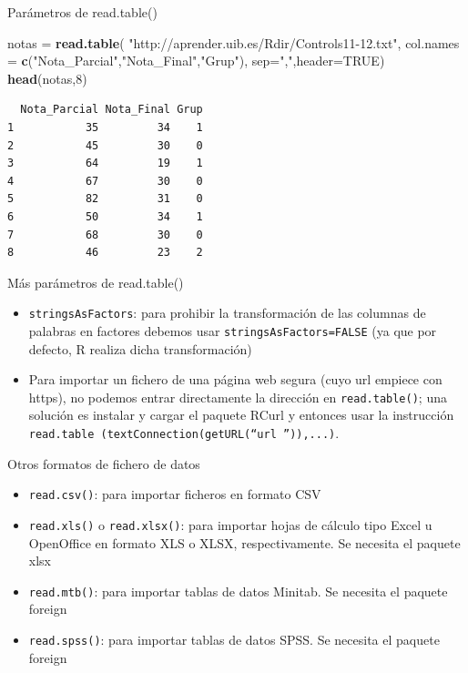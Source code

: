 \documentclass[
  ignorenonframetext,
  aspectratio=169]{beamer}
\newenvironment{Shaded}{\begin{snugshade}}{\end{snugshade}}
\newcommand{\AttributeTok}[1]{\textcolor[rgb]{0.13,0.29,0.53}{#1}}
\newcommand{\ConstantTok}[1]{\textcolor[rgb]{0.56,0.35,0.01}{#1}}
\newcommand{\DecValTok}[1]{\textcolor[rgb]{0.00,0.00,0.81}{#1}}
\newcommand{\FunctionTok}[1]{\textcolor[rgb]{0.13,0.29,0.53}{\textbf{#1}}}
\newcommand{\NormalTok}[1]{#1}
\newcommand{\OtherTok}[1]{\textcolor[rgb]{0.56,0.35,0.01}{#1}}
\newcommand{\StringTok}[1]{\textcolor[rgb]{0.31,0.60,0.02}{#1}}
\providecommand{\tightlist}{%
  \setlength{\itemsep}{0pt}\setlength{\parskip}{0pt}}
\begin{document}
\begin{frame}[fragile]{Parámetros de read.table()}
\label{paruxe1metros-de-read.table}
\begin{Shaded}
\begin{Highlighting}[]
\NormalTok{notas }\OtherTok{=} \FunctionTok{read.table}\NormalTok{(}
  \StringTok{"http://aprender.uib.es/Rdir/Controls11{-}12.txt"}\NormalTok{, }
  \AttributeTok{col.names =} \FunctionTok{c}\NormalTok{(}\StringTok{"Nota\_Parcial"}\NormalTok{,}\StringTok{"Nota\_Final"}\NormalTok{,}\StringTok{"Grup"}\NormalTok{),}
  \AttributeTok{sep=}\StringTok{","}\NormalTok{,}\AttributeTok{header=}\ConstantTok{TRUE}\NormalTok{)}
\FunctionTok{head}\NormalTok{(notas,}\DecValTok{8}\NormalTok{)}
\end{Highlighting}
\end{Shaded}

\begin{verbatim}
  Nota_Parcial Nota_Final Grup
1           35         34    1
2           45         30    0
3           64         19    1
4           67         30    0
5           82         31    0
6           50         34    1
7           68         30    0
8           46         23    2
\end{verbatim}
\end{frame}

\begin{frame}[fragile]{Más parámetros de read.table()}
\label{muxe1s-paruxe1metros-de-read.table}
\begin{itemize}
\item
  \texttt{stringsAsFactors}: para prohibir la transformación de las
  columnas de palabras en factores debemos usar
  \texttt{stringsAsFactors=FALSE} (ya que por defecto, R realiza dicha
  transformación)
\item
  Para importar un fichero de una página web segura (cuyo url empiece
  con https), no podemos entrar directamente la dirección en
  \texttt{read.table()}; una solución es instalar y cargar el paquete
  RCurl y entonces usar la instrucción
  \texttt{read.table\ (textConnection(getURL(“url\ ”)),...)}.
\end{itemize}
\end{frame}

\begin{frame}[fragile]{Otros formatos de fichero de datos}
\label{otros-formatos-de-fichero-de-datos}
\begin{itemize}
\tightlist
\item
  \texttt{read.csv()}: para importar ficheros en formato CSV
\item
  \texttt{read.xls()} o \texttt{read.xlsx()}: para importar hojas de
  cálculo tipo Excel u OpenOffice en formato XLS o XLSX,
  respectivamente. Se necesita el paquete xlsx
\item
  \texttt{read.mtb()}: para importar tablas de datos Minitab. Se
  necesita el paquete foreign
\item
  \texttt{read.spss()}: para importar tablas de datos SPSS. Se necesita
  el paquete foreign
\end{itemize}
\end{frame}
\end{document}
